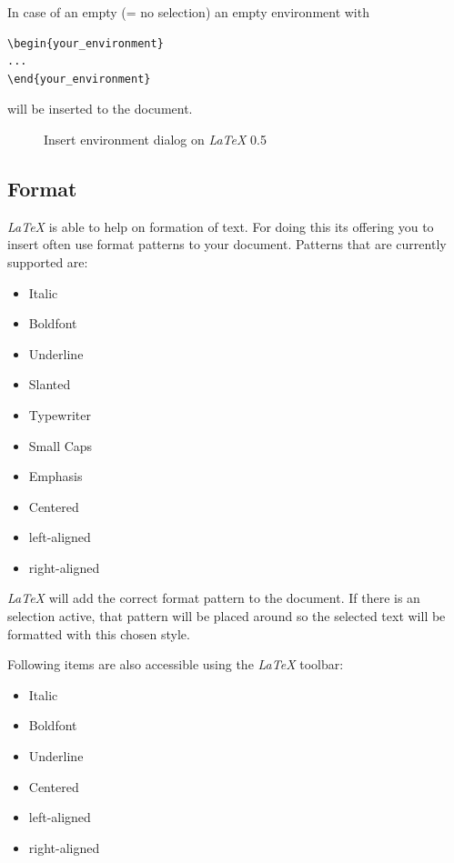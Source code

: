 \documentclass[%
paper=a4,%
fontsize=11pt,%
twoside=false,%
DIV18,%
headsepline,%
plainheadsepline,%
footsepline,%
plainfootsepline,%
bibliography=totoc,%
listof=totoc,%
BCOR10mm,%
parskip=half,%
openany,%
]{scrartcl}
\begin{document}
In case of an empty (= no selection) an empty environment with

\begin{lstlisting}
\begin{your_environment}
...
\end{your_environment}
\end{lstlisting}


will be inserted to the document.

\begin{figure}[h!]
	\caption{Insert environment dialog on \textit{LaTeX} 0.5}
\end{figure}


\subsection{Format}
\textit{LaTeX} is able to help on formation of text. For doing this its
offering you to insert often use format patterns to your document.
Patterns that are currently supported are:

\begin{itemize}
	\item Italic
	\item Boldfont
	\item Underline
	\item Slanted
	\item Typewriter
	\item Small Caps
	\item Emphasis
	\item Centered
	\item left-aligned
	\item right-aligned
\end{itemize}

\textit{LaTeX} will add the correct format pattern to the document. If
there is an selection active, that pattern will be placed around so
the selected text will be formatted with this chosen style.

Following items are also accessible using the \textit{LaTeX} toolbar:
\begin{itemize}
	\item Italic
	\item Boldfont
	\item Underline
	\item Centered
	\item left-aligned
	\item right-aligned
\end{itemize}
\end{document}
